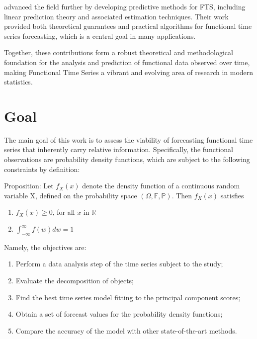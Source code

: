 \documentclass[
	12pt,				%
	oneside,			%
	a4paper,			%
	english,			%
	brazil				%
	]{abntex2ppgsi}
\begin{document}
 advanced the field further by developing predictive methods for FTS, including linear prediction theory and associated estimation techniques. Their work provided both theoretical guarantees and practical algorithms for functional time series forecasting, which is a central goal in many applications.

Together, these contributions form a robust theoretical and methodological foundation for the analysis and prediction of functional data observed over time, making Functional Time Series a vibrant and evolving area of research in modern statistics.





\chapter{Goal}
The main goal of this work is to assess the viability of forecasting functional time series that inherently carry relative information. Specifically, the functional observations are probability density functions, which are subject to the following constraints by definition:

Proposition: Let $f_X(x)$ denote the density function of a continuous random variable X,  defined on the probability space $(\Omega, \mathbb{F}, \mathbb{P})$. Then $f_X(x)$ satisfies
\begin{enumerate}
    \item $f_X(x)\geq0$, for all $x$ in $\mathbb{R}$
    \item $\int_{-\infty}^{\infty}f(w)dw=1$
\end{enumerate}

Namely, the objectives are:
\begin{enumerate}
    \item Perform a data analysis step of the time series subject to the study;
    \item Evaluate the decomposition of objects;
    \item Find the best time series model fitting to the principal component scores;
    \item Obtain a set of forecast values for the probability density functions;
    \item Compare the accuracy of the model with other state-of-the-art methods.
\end{enumerate}
\end{document}
